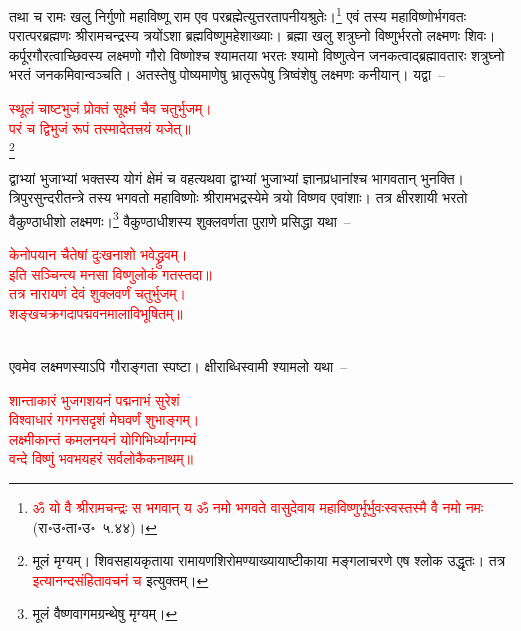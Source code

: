 \begin{sloppypar}
तथा च रामः खलु निर्गुणो महा\-विष्णू राम एव पर\-ब्रह्मेत्युत्तर\-तापनीय\-श्रुतेः।\footnote{\textcolor{red}{ॐ यो वै श्रीरामचन्द्रः स भगवान् य ॐ नमो भगवते वासुदेवाय महाविष्णुर्भूर्भुवःस्वस्तस्मै वै नमो नमः} (रा॰उ॰ता॰उ॰~५.४४)।} एवं तस्य महा\-विष्णोर्भगवतः परात्परब्रह्मणः श्रीरामचन्द्रस्य त्रयोंऽशा ब्रह्म\-विष्णु\-महेशाख्याः।
ब्रह्मा खलु शत्रुघ्नो विष्णुर्भरतो लक्ष्मणः शिवः। कर्पूर\-गौरत्वाच्छिवस्य लक्ष्मणो गौरो विष्णोश्च श्यामतया भरतः श्यामो विष्णुत्वेन जनकत्वाद्ब्रह्मावतारः शत्रुघ्नो भरतं जनकमिवान्वञ्चति। अतस्तेषु पोष्यमाणेषु भ्रातृ\-रूपेषु त्रिष्वंशेषु लक्ष्मणः कनीयान्। यद्वा~–\end{sloppypar}
\centering\textcolor{red}{स्थूलं चाष्टभुजं प्रोक्तं सूक्ष्मं चैव चतुर्भुजम्।\nopagebreak\\
परं च द्विभुजं रूपं तस्मादेतत्त्रयं यजेत्॥}\nopagebreak\\
\footnote{मूलं मृग्यम्। शिवसहाय\-कृताया रामायण\-शिरोमण्याख्यायाष्टीकाया मङ्गलाचरणे एष श्लोक उद्धृतः। तत्र \textcolor{red}{इत्यानन्द\-संहिता\-वचनं च} इत्युक्तम्।}\\
\begin{sloppypar}\justifying\noindent
द्वाभ्यां भुजाभ्यां भक्तस्य योगं क्षेमं च वहत्यथवा द्वाभ्यां भुजाभ्यां ज्ञान\-प्रधानांश्च भागवतान् भुनक्ति। त्रिपुर\-सुन्दरी\-तन्त्रे तस्य भगवतो महाविष्णोः श्रीरामभद्रस्येमे त्रयो विष्णव एवांशाः। तत्र क्षीरशायी भरतो वैकुण्ठाधीशो लक्ष्मणः।\footnote{मूलं वैष्णवागम\-ग्रन्थेषु मृग्यम्।} वैकुण्ठाधीशस्य शुक्ल\-वर्णता पुराणे प्रसिद्धा यथा~–\end{sloppypar}
\centering\textcolor{red}{केनोपयान चैतेषां दुःखनाशो भवेद्ध्रुवम्।\nopagebreak\\
इति सञ्चिन्त्य मनसा विष्णुलोकं गतस्तदा॥\nopagebreak\\
तत्र नारायणं देवं शुक्लवर्णं चतुर्भुजम्।\nopagebreak\\
शङ्खचक्रगदापद्मवनमालाविभूषितम्॥}\nopagebreak\\
\\
\begin{sloppypar}\justifying\noindent एवमेव लक्ष्मणस्याऽपि गौराङ्गता स्पष्टा। क्षीराब्धि\-स्वामी श्यामलो यथा~–\end{sloppypar}
\centering\textcolor{red}{शान्ताकारं भुजगशयनं पद्मनाभं सुरेशं\nopagebreak\\
विश्वाधारं गगनसदृशं मेघवर्णं शुभाङ्गम्।\nopagebreak\\
लक्ष्मीकान्तं कमलनयनं योगिभिर्ध्यानगम्यं\nopagebreak\\
वन्दे विष्णुं भवभयहरं सर्वलोकैकनाथम्॥}\nopagebreak\\
